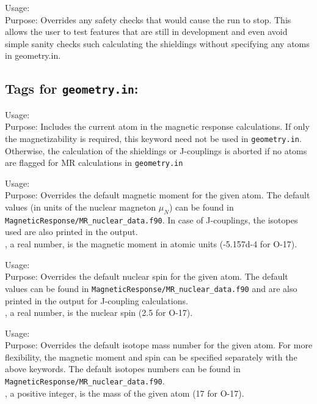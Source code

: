 {
  \noindent
  Usage: \\[1.0ex]
  Purpose: Overrides any safety checks that would cause the run to stop. This allows the user to test features that are still in development and even avoid simple sanity checks such calculating the shieldings without specifying any atoms in geometry.in.
}

\subsection*{Tags for \texttt{geometry.in}:}
{
  \noindent
  Usage:  \\[1.0ex]
  Purpose: Includes the current atom in the magnetic response calculations. If only the magnetizability is required, this keyword need not be used in \texttt{geometry.in}. Otherwise, the calculation of the shieldings or J-couplings is aborted if no atoms are flagged for MR calculations in \texttt{geometry.in}\\[1.0ex]
}

{
  \noindent
  Usage:  \\[1.0ex]
  Purpose: Overrides the default magnetic moment for the given atom. The default values (in units of the nuclear magneton $\mu_N$) can be found in \texttt{MagneticResponse/MR\_nuclear\_data.f90}. In case of J-couplings, the isotopes used are also printed in the output.\\[1.0ex]
  , a real number, is the magnetic moment in atomic units (-5.157d-4 for O-17).
}

{
  \noindent
  Usage:  \\[1.0ex]
  Purpose: Overrides the default nuclear spin for the given atom. The default values can be found in \texttt{MagneticResponse/MR\_nuclear\_data.f90} and are also printed in the output for J-coupling calculations.\\[1.0ex]
  , a real number, is the nuclear spin (2.5 for O-17).
}

{
  \noindent
  Usage:  \\[1.0ex]
  Purpose: Overrides the default isotope mass number for the given atom. For more flexibility, the magnetic moment and spin can be specified separately with the above keywords. The default isotopes numbers can be found in \texttt{MagneticResponse/MR\_nuclear\_data.f90}.\\[1.0ex]
  , a positive integer, is the mass of the given atom (17 for O-17).
}

